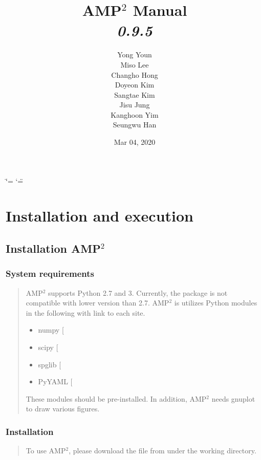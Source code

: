 \documentclass[letterpaper,10pt,english]{sphinxmanual}
\title{AMP$^\text{2}$ Manual \\ \textit{0.9.5}}
\date{Mar 04, 2020}
\author{Yong Youn \\ Miso Lee \\ Changho Hong \\ Doyeon Kim \\ Sangtae Kim \\ Jisu Jung \\ Kanghoon Yim \\ Seungwu Han}
\begin{document}
\ifdefined\shorthandoff
  \ifnum\catcode`\=\string=\active\shorthandoff{=}\fi
  \ifnum\catcode`\"=\active{}\fi
\fi

\pagestyle{empty}
\sphinxmaketitle
\pagestyle{plain}
\sphinxtableofcontents
\pagestyle{normal}
\label{\detokenize{index::doc}}



\chapter{Installation and execution}
\label{\detokenize{Installation/Installation:installation-and-execution}}\label{\detokenize{Installation/Installation::doc}}

\section{Installation AMP$^{\text{2}}$}
\label{\detokenize{Installation/Installation:installation-amp2}}

\subsection{System requirements}
\label{\detokenize{Installation/Installation:system-requirements}}\begin{quote}

AMP$^{\text{2}}$ supports Python 2.7 and 3. Currently, the package is not compatible
with lower version than 2.7. AMP$^{\text{2}}$ is utilizes Python modules
in the following with link to each site.
\begin{itemize}
\item {} 
numpy {[}\sphinxurl{https://www.numpy.org}{]}

\item {} 
scipy {[}\sphinxurl{https://www.scipy.org}{]}

\item {} 
spglib {[}\sphinxurl{https://atztogo.github.io/spglib}{]}

\item {} 
PyYAML {[}\sphinxurl{https://pypi.org/project/PyYAML}{]}

\end{itemize}

These modules should be pre-installed. In addition, AMP$^{\text{2}}$ needs gnuplot to draw
various figures.
\end{quote}


\subsection{Installation}
\label{\detokenize{Installation/Installation:installation}}\begin{quote}

To use AMP$^{\text{2}}$, please download the file from  under the
working directory.
\end{quote}
\end{document}
